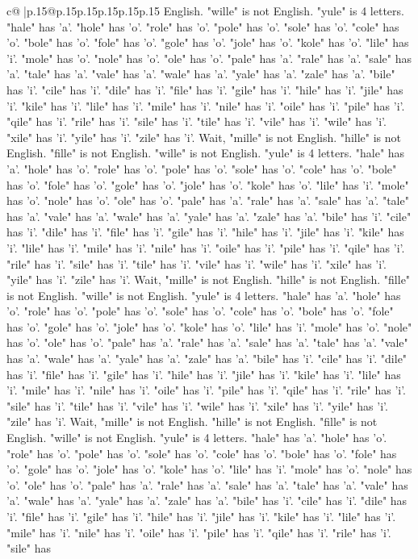 \documentclass{article}
\begin{document}
{\begin{supertabular}{c@{$\;$}|p{.15\linewidth}@{}p{.15\linewidth}p{.15\linewidth}p{.15\linewidth}p{.15\linewidth}p{.15\linewidth}}
{{{English. "wille" is not English. "yule" is 4 letters. "hale" has 'a'. "hole" has 'o'. "role" has 'o'. "pole" has 'o'. "sole" has 'o'. "cole" has 'o'. "bole" has 'o'. "fole" has 'o'. "gole" has 'o'. "jole" has 'o'. "kole" has 'o'. "lile" has 'i'. "mole" has 'o'. "nole" has 'o'. "ole" has 'o'. "pale" has 'a'. "rale" has 'a'. "sale" has 'a'. "tale" has 'a'. "vale" has 'a'. "wale" has 'a'. "yale" has 'a'. "zale" has 'a'. "bile" has 'i'. "cile" has 'i'. "dile" has 'i'. "file" has 'i'. "gile" has 'i'. "hile" has 'i'. "jile" has 'i'. "kile" has 'i'. "lile" has 'i'. "mile" has 'i'. "nile" has 'i'. "oile" has 'i'. "pile" has 'i'. "qile" has 'i'. "rile" has 'i'. "sile" has 'i'. "tile" has 'i'. "vile" has 'i'. "wile" has 'i'. "xile" has 'i'. "yile" has 'i'. "zile" has 'i'. Wait, "mille" is not English. "hille" is not English. "fille" is not English. "wille" is not English. "yule" is 4 letters. "hale" has 'a'. "hole" has 'o'. "role" has 'o'. "pole" has 'o'. "sole" has 'o'. "cole" has 'o'. "bole" has 'o'. "fole" has 'o'. "gole" has 'o'. "jole" has 'o'. "kole" has 'o'. "lile" has 'i'. "mole" has 'o'. "nole" has 'o'. "ole" has 'o'. "pale" has 'a'. "rale" has 'a'. "sale" has 'a'. "tale" has 'a'. "vale" has 'a'. "wale" has 'a'. "yale" has 'a'. "zale" has 'a'. "bile" has 'i'. "cile" has 'i'. "dile" has 'i'. "file" has 'i'. "gile" has 'i'. "hile" has 'i'. "jile" has 'i'. "kile" has 'i'. "lile" has 'i'. "mile" has 'i'. "nile" has 'i'. "oile" has 'i'. "pile" has 'i'. "qile" has 'i'. "rile" has 'i'. "sile" has 'i'. "tile" has 'i'. "vile" has 'i'. "wile" has 'i'. "xile" has 'i'. "yile" has 'i'. "zile" has 'i'. Wait, "mille" is not English. "hille" is not English. "fille" is not English. "wille" is not English. "yule" is 4 letters. "hale" has 'a'. "hole" has 'o'. "role" has 'o'. "pole" has 'o'. "sole" has 'o'. "cole" has 'o'. "bole" has 'o'. "fole" has 'o'. "gole" has 'o'. "jole" has 'o'. "kole" has 'o'. "lile" has 'i'. "mole" has 'o'. "nole" has 'o'. "ole" has 'o'. "pale" has 'a'. "rale" has 'a'. "sale" has 'a'. "tale" has 'a'. "vale" has 'a'. "wale" has 'a'. "yale" has 'a'. "zale" has 'a'. "bile" has 'i'. "cile" has 'i'. "dile" has 'i'. "file" has 'i'. "gile" has 'i'. "hile" has 'i'. "jile" has 'i'. "kile" has 'i'. "lile" has 'i'. "mile" has 'i'. "nile" has 'i'. "oile" has 'i'. "pile" has 'i'. "qile" has 'i'. "rile" has 'i'. "sile" has 'i'. "tile" has 'i'. "vile" has 'i'. "wile" has 'i'. "xile" has 'i'. "yile" has 'i'. "zile" has 'i'. Wait, "mille" is not English. "hille" is not English. "fille" is not English. "wille" is not English. "yule" is 4 letters. "hale" has 'a'. "hole" has 'o'. "role" has 'o'. "pole" has 'o'. "sole" has 'o'. "cole" has 'o'. "bole" has 'o'. "fole" has 'o'. "gole" has 'o'. "jole" has 'o'. "kole" has 'o'. "lile" has 'i'. "mole" has 'o'. "nole" has 'o'. "ole" has 'o'. "pale" has 'a'. "rale" has 'a'. "sale" has 'a'. "tale" has 'a'. "vale" has 'a'. "wale" has 'a'. "yale" has 'a'. "zale" has 'a'. "bile" has 'i'. "cile" has 'i'. "dile" has 'i'. "file" has 'i'. "gile" has 'i'. "hile" has 'i'. "jile" has 'i'. "kile" has 'i'. "lile" has 'i'. "mile" has 'i'. "nile" has 'i'. "oile" has 'i'. "pile" has 'i'. "qile" has 'i'. "rile" has 'i'. "sile" has }}}
\end{supertabular}}
\end{document}
